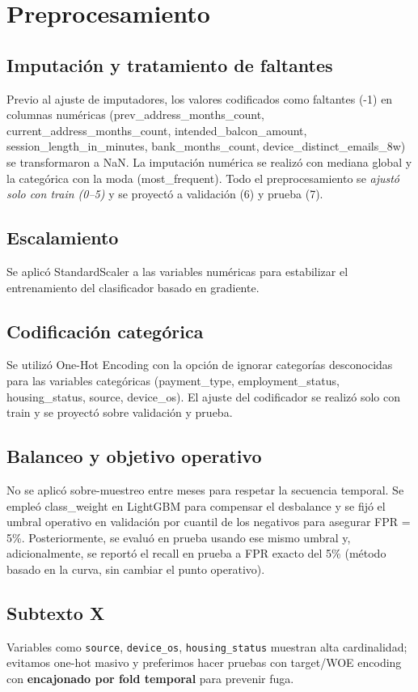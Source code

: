 \documentclass[runningheads]{llncs}
\begin{document}
\section{Preprocesamiento}

\subsection{Imputación y tratamiento de faltantes}
Previo al ajuste de imputadores, los valores codificados como faltantes (-1) en columnas numéricas (prev\_address\_months\_count, current\_address\_months\_count, intended\_balcon\_amount, session\_length\_in\_minutes, bank\_months\_count, device\_distinct\_emails\_8w) se transformaron a NaN. 
La imputación numérica se realizó con mediana global y la categórica con la moda (most\_frequent). 
Todo el preprocesamiento se \textit{ajustó solo con train (0–5)} y se proyectó a validación (6) y prueba (7).

\subsection{Escalamiento}
Se aplicó StandardScaler a las variables numéricas para estabilizar el entrenamiento del clasificador basado en gradiente.

\subsection{Codificación categórica}
Se utilizó One-Hot Encoding con la opción de ignorar categorías desconocidas para las variables categóricas (payment\_type, employment\_status, housing\_status, source, device\_os). 
El ajuste del codificador se realizó solo con train y se proyectó sobre validación y prueba.

\subsection{Balanceo y objetivo operativo}
No se aplicó sobre-muestreo entre meses para respetar la secuencia temporal. 
Se empleó class\_weight en LightGBM para compensar el desbalance y se fijó el umbral operativo en validación por cuantil de los negativos para asegurar FPR = 5\%. 
Posteriormente, se evaluó en prueba usando ese mismo umbral y, adicionalmente, se reportó el recall en prueba a FPR exacto del 5\% (método basado en la curva, sin cambiar el punto operativo).

\subsection{Subtexto X}
Variables como \texttt{source}, \texttt{device\_os}, \texttt{housing\_status} muestran alta cardinalidad; evitamos one-hot masivo y preferimos hacer pruebas con target/WOE encoding con \textbf{encajonado por fold temporal} para prevenir fuga.
\end{document}
